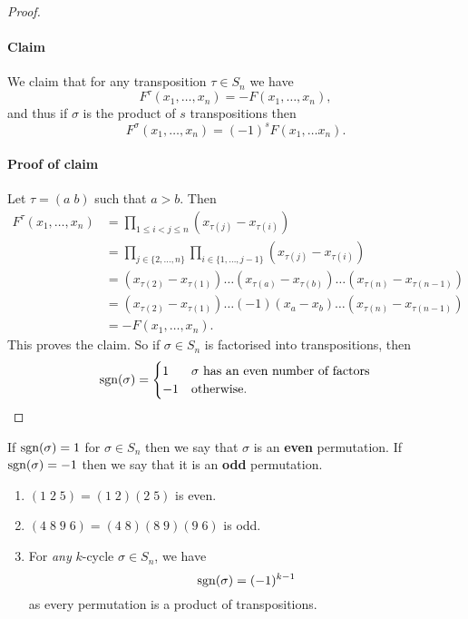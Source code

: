 \begin{proof}
    \hfill
    \paragraph{Claim}
    We claim that for any transposition $\tau \in S_n$ we have
    \[
        F^\tau(x_1,\ldots,x_n) = -F(x_1,\ldots,x_n),
    \]
    and thus if $\sigma$ is the product of $s$ transpositions then
    \[
        F^\sigma(x_1, \ldots, x_n) = (-1)^s F(x_1, \ldots x_n).
    \]

    \paragraph{Proof of claim}
    Let $\tau = (a\;b)$ such that $a > b$.
    Then 
    \begin{align*}
        F^\tau(x_1, \ldots, x_n)
        &= \prod_{1 \leq i < j \leq n} \left(x_{\tau(j)} - x_{\tau(i)}\right) \\
        &= \prod_{j \in \{2, \ldots, n\}} \prod_{i \in \{1, \ldots, j-1\}}
            \left(x_{\tau(j)} - x_{\tau(i)}\right) \\
        &= \left(x_{\tau(2)} - x_{\tau(1)}\right) \ldots
            \left(x_{\tau(a)} - x_{\tau(b)}\right) \ldots
            \left(x_{\tau(n)} - x_{\tau(n-1)}\right) \\
        &= \left(x_{\tau(2)} - x_{\tau(1)}\right) \ldots
            (-1)\left(x_{a} - x_{b}\right) \ldots
            \left(x_{\tau(n)} - x_{\tau(n-1)}\right) \\
        &= -F(x_1, \ldots, x_n).
    \end{align*}
    This proves the claim.
    So if $\sigma \in S_n$ is factorised into transpositions, then
    \[
        \operatorname{sgn}(\sigma) =
        \begin{cases}
            1 & \text{$\sigma$ has an even number of factors} \\
            -1 & \text{otherwise}.
        \end{cases}
    \]
\end{proof}

If $\operatorname{sgn}(\sigma) = 1$ for $\sigma \in S_n$ then we 
say that $\sigma$ is an \textbf{even} permutation.
If $\operatorname{sgn}(\sigma) = -1$ then we say that it is an \textbf{odd} permutation.

\begin{example}
    \begin{enumerate}
        \item $(1\;2\;5) = (1\;2)(2\;5)$ is even.
        \item $(4\;8\;9\;6)=(4\;8)(8\;9)(9\;6)$ is odd.
        \item For \emph{any} $k$-cycle $\sigma \in S_n$, we have
            \[
                \operatorname{sgn}(\sigma) = (-1)^{k - 1}
            \]
            as every permutation is a product of transpositions.
    \end{enumerate}
\end{example}


